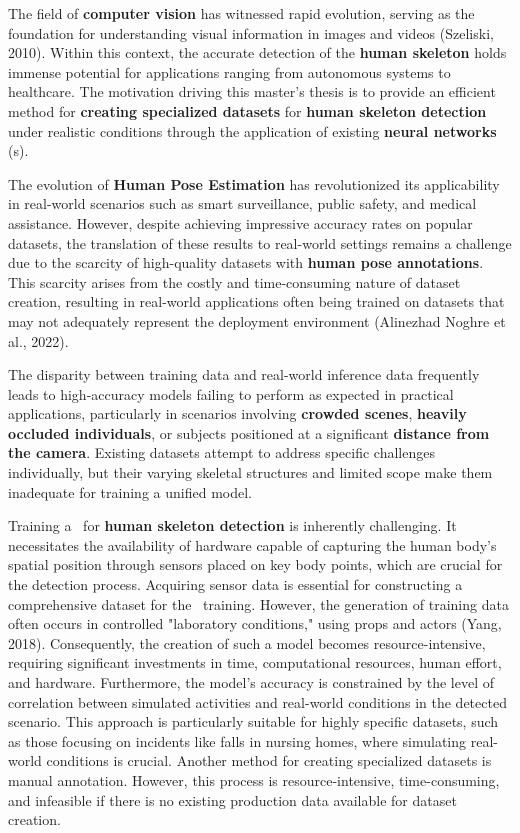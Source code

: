 

The field of {\bf computer vision} has witnessed rapid evolution, serving as the foundation for understanding visual information in images and videos (\scc Szeliski, 2010). Within this context, the accurate detection of the {\bf human skeleton} holds immense potential for applications ranging from autonomous systems to healthcare. The motivation driving this master's thesis is to provide an efficient method for {\bf creating specialized datasets} for {\bf human skeleton detection} under realistic conditions through the application of existing {\bf neural networks} (\NN\-s).

The evolution of {\bf Human Pose Estimation} has revolutionized its applicability in real-world scenarios such as smart surveillance, public safety, and medical assistance. However, despite achieving impressive accuracy rates on popular datasets, the translation of these results to real-world settings remains a challenge due to the scarcity of high-quality datasets with {\bf human pose annotations}. This scarcity arises from the costly and time-consuming nature of dataset creation, resulting in real-world applications often being trained on datasets that may not adequately represent the deployment environment (\scc Alinezhad Noghre et al., 2022).

The disparity between training data and real-world inference data frequently leads to high-accuracy models failing to perform as expected in practical applications, particularly in scenarios involving {\bf crowded scenes}, {\bf heavily occluded individuals}, or subjects positioned at a significant {\bf distance from the camera}. Existing datasets attempt to address specific challenges individually, but their varying skeletal structures and limited scope make them inadequate for training a unified model.

Training a \NN\ for {\bf human skeleton detection} is inherently challenging. It necessitates the availability of hardware capable of capturing the human body's spatial position through sensors placed on key body points, which are crucial for the detection process. Acquiring sensor data is essential for constructing a comprehensive dataset for the \NN\ training. However, the generation of training data often occurs in controlled "laboratory conditions," using props and actors (\scc Yang, 2018). Consequently, the creation of such a model becomes resource-intensive, requiring significant investments in time, computational resources, human effort, and hardware. Furthermore, the model's accuracy is constrained by the level of correlation between simulated activities and real-world conditions in the detected scenario. This approach is particularly suitable for highly specific datasets, such as those focusing on incidents like falls in nursing homes, where simulating real-world conditions is crucial. Another method for creating specialized datasets is manual annotation. However, this process is resource-intensive, time-consuming, and infeasible if there is no existing production data available for dataset creation.

